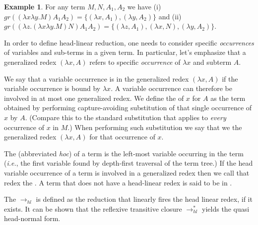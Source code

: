 \documentclass{elsarticle}
\makeatletter
\theoremstyle{plain}
\theoremstyle{definition}
\newtheorem{example}{Example}[section]
\theoremstyle{remark}
\renewcommand\ie{{\it i.e.\@\xspace}}
\newcommand{\hlred}{\rightarrow_{hl}}
\makeatother
\begin{document}
\begin{example} For any term $M, N, A_1, A_2$ we have
(i) $gr((\lambda x \lambda y . M) A_1 A_2) = \{ (\lambda x, A_1), (\lambda y, A_2)\}$ and
(ii) $gr((\lambda z . (\lambda x \lambda y . M) N) A_1 A_2) = \{ (\lambda z, A_1), (\lambda x, N), (\lambda y, A_2)\}$.
\end{example}

In order to define head-linear reduction, one needs to consider specific \emph{occurrences} of variables and sub-terms in a given term. In particular, let's emphasize that a generalized redex  $(\lambda x, A)$ refers to specific \emph{occurrence} of $\lambda x$ and subterm $A$.

We say that a variable occurrence is  in the generalized redex $(\lambda x, A)$ if the variable occurrence is bound by $\lambda x$. A variable occurrence can therefore be involved in at most one generalized redex. We define the  of $x$ for $A$ as the term obtained by performing capture-avoiding substitution of that single occurrence of $x$ by $A$. (Compare this to the standard substitution that applies to \emph{every} occurrence of $x$ in $M$.) When performing such substitution we say that we  the generalized redex $(\lambda x, A)$ for that occurrence of $x$.

The  (abbreviated \emph{hoc}) of a term is the left-most variable occurring in the term (\ie, the first variable found by depth-first traversal of the term tree.) If the head variable occurrence of a term is involved in a generalized redex then we call that redex the .
A term that does not have a head-linear redex is said to be in .

The  $\hlred$ is defined as the reduction that linearly fires the head linear redex, if it exists\cite{danos-head,danosherbelinregnier1996}. It can be shown that the reflexive transitive closure $\rightarrow^*_{hl}$ yields the quasi head-normal form.
\end{document}
